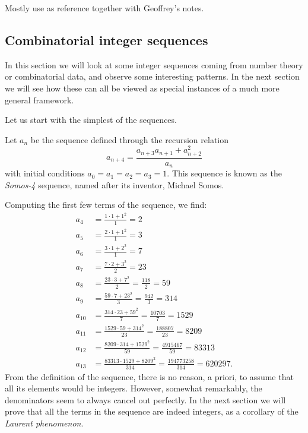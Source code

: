 Mostly use \cite{FominWilliams2021IntroductionCA_1-3} as reference together with
Geoffrey's notes.

\subsection{Combinatorial integer sequences}

In this section we will look at some integer sequences coming from number theory or
combinatorial data, and observe some interesting patterns. In the next section we will
see how these can all be viewed as special instances of a much more general framework.

Let us start with the simplest of the sequences.
\begin{definition}
	Let $a_n$ be the sequence defined through the recursion relation
	\begin{equation}
		\label{eq:somos_4}
		a_{n+4} = \frac{a_{n+3}a_{n+1}+ a_{n+2}^2}{a_n}
	\end{equation}
	with initial conditions $a_0 = a_1 = a_2 = a_3 = 1$. This sequence is known as the \emph{Somos-4} sequence, named after its inventor, Michael Somos.
\end{definition}
Computing the first few terms of the sequence, we find:
\begin{align*}
	a_4    & = \frac{1 \cdot 1 + 1^2}{1} = 2                                           \\
	a_5    & = \frac{2 \cdot 1 + 1^2}{1} = 3                                           \\
	a_6    & = \frac{3 \cdot 1 + 2^2}{1} = 7                                           \\
	a_7    & = \frac{7 \cdot 2 + 3^2}{2} = 23                                          \\
	a_8    & = \frac{23 \cdot 3 + 7^2}{2} = \frac{118}{2} = 59                         \\
	a_9    & = \frac{59 \cdot 7 + 23^2}{3} = \frac{942}{3} = 314                       \\
	a_{10} & = \frac{314 \cdot 23 + 59^2}{7} = \frac{10703}{7} = 1529                  \\
	a_{11} & = \frac{1529 \cdot 59 + 314^2}{23} = \frac{188807}{23} = 8209             \\
	a_{12} & = \frac{8209 \cdot 314 + 1529^2}{59} = \frac{4915467}{59} = 83313         \\
	a_{13} & = \frac{83313 \cdot 1529 + 8209^2}{314} = \frac{194773258}{314} = 620297.
\end{align*}
From the definition of the sequence, there is no reason, a priori, to assume that all its elements would be integers. However, somewhat remarkably, the denominators seem to always cancel out perfectly. In the next section we will prove that all the terms in the sequence are indeed integers,
as a corollary of the \emph{Laurent phenomenon}.

